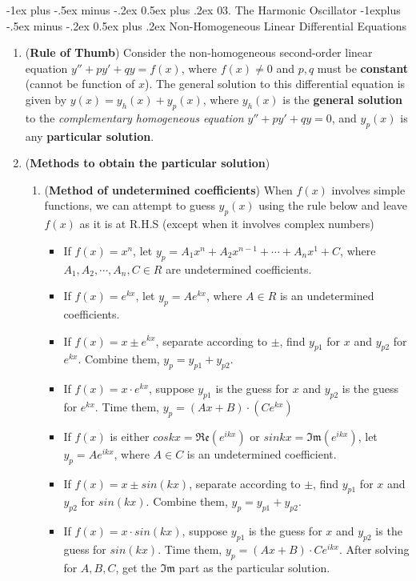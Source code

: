 \documentclass[10pt, landscape]{article}
\makeatletter
\renewcommand{\section}{\@startsection{section}{1}{0mm}%
                                {-1ex plus -.5ex minus -.2ex}%
                                {0.5ex plus .2ex}%
                                {\normalfont\large\bfseries}}
\renewcommand{\subsection}{\@startsection{subsection}{2}{0mm}%
                                {-1explus -.5ex minus -.2ex}%
                                {0.5ex plus .2ex}%
                                {\normalfont\normalsize\bfseries}}
\makeatother
\begin{document}
\begin{multicols}{4}
\section{03. The Harmonic Oscillator}
\subsection{Non-Homogeneous Linear Differential Equations}
\begin{enumerate}
    \item (\textbf{Rule of Thumb}) Consider the non-homogeneous second-order linear equation $y''+py'+qy=f(x)$, where $f(x)\neq 0$ and $p, q$ must be \textbf{constant} (cannot be function of $x$). The general solution to this differential equation is given by $y(x)=y_h(x)+y_p(x)$, where $y_h(x)$ is the \textbf{general solution} to the \textit{complementary homogeneous equation} $y''+py'+qy=0$, and $y_p(x)$ is any \textbf{particular solution}.
    \item (\textbf{Methods to obtain the particular solution})
    \begin{enumerate}
        \item (\textbf{Method of undetermined coefficients}) When $f(x)$ involves simple functions, we can attempt to guess $y_p(x)$ using the rule below and leave $f(x)$ as it is at R.H.S (except when it involves complex numbers)
        \begin{itemize}
            \item If $f(x)=x^n$, let $y_p=A_1x^n+A_2x^{n-1}+\cdots+A_nx^1+C$, where $A_1, A_2,\cdots, A_n, C \in R$ are undetermined coefficients.
            \item If $f(x)=e^{kx}$, let $y_p=Ae^{kx}$, where $A\in R$ is an undetermined coefficients.
            \item If $f(x)=x\pm e^{kx}$, separate according to $\pm$, find $y_{p1}$ for $x$ and $y_{p2}$ for $e^{kx}$. Combine them, $y_p=y_{p1}+y_{p2}$.
            \item If $f(x)=x\cdot e^{kx}$, suppose $y_{p1}$ is the guess for $x$ and $y_{p2}$ is the guess for $e^{kx}$. Time them, $y_p=(Ax+B)\cdot(Ce^{kx})$
            \item If $f(x)$ is either $coskx=\Re\mathfrak{e}(e^{ikx})$ or $sinkx=\Im\mathfrak{m}(e^{ikx})$, let $y_p=Ae^{ikx}$, where $A\in C$ is an undetermined coefficient.
            \item If $f(x)=x\pm sin(kx)$, separate according to $\pm$, find $y_{p1}$ for $x$ and $y_{p2}$ for $sin(kx)$. Combine them, $y_p=y_{p1}+y_{p2}$.
            \item  If $f(x)=x\cdot sin(kx)$, suppose $y_{p1}$ is the guess for $x$ and $y_{p2}$ is the guess for $sin(kx)$. Time them, $y_p=(Ax+B)\cdot Ce^{ikx}$. After solving for $A,B,C$, get the $\Im\mathfrak{m}$ part as the particular solution.

\end{itemize}
\end{enumerate}
\end{enumerate}
\end{multicols}
\end{document}
